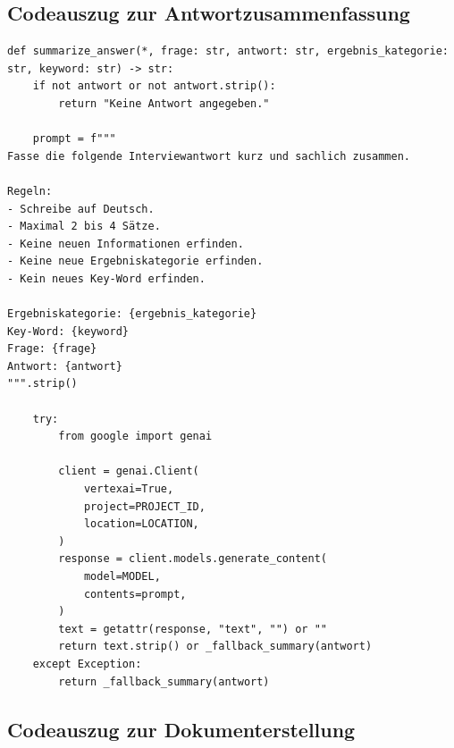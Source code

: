 \documentclass[
  10pt,
  ngerman,
  a4paper,
  toc=graduated,
  numbers=noenddot,
  headings=standardclasses,
  nonumberlist
]{scrartcl}
\begin{document}
\newpage
\subsection{Codeauszug zur Antwortzusammenfassung}
\label{anhang_zusammenfassung}

\begin{lstlisting}[style=pythoncode, numbers=none, caption={Antwortzusammenfassung mit Fallback}, label={lst:zusammenfassung}]
def summarize_answer(*, frage: str, antwort: str, ergebnis_kategorie: str, keyword: str) -> str:
    if not antwort or not antwort.strip():
        return "Keine Antwort angegeben."

    prompt = f"""
Fasse die folgende Interviewantwort kurz und sachlich zusammen.

Regeln:
- Schreibe auf Deutsch.
- Maximal 2 bis 4 Sätze.
- Keine neuen Informationen erfinden.
- Keine neue Ergebniskategorie erfinden.
- Kein neues Key-Word erfinden.

Ergebniskategorie: {ergebnis_kategorie}
Key-Word: {keyword}
Frage: {frage}
Antwort: {antwort}
""".strip()

    try:
        from google import genai

        client = genai.Client(
            vertexai=True,
            project=PROJECT_ID,
            location=LOCATION,
        )
        response = client.models.generate_content(
            model=MODEL,
            contents=prompt,
        )
        text = getattr(response, "text", "") or ""
        return text.strip() or _fallback_summary(antwort)
    except Exception:
        return _fallback_summary(antwort)
\end{lstlisting}

\newpage
\subsection{Codeauszug zur Dokumenterstellung}
\label{anhang_dokumenterstellung}
\end{document}
